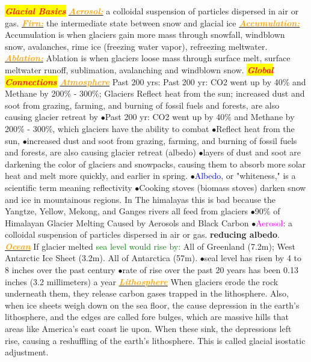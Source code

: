 \documentclass{article}
\author{SBHS Science Olympiad, Gold}
\newcommand{\ddd}{$\bullet$}
\newcommand{\red}[1]{\textcolor{red}{#1}}
\newcommand{\green}[1]{\textcolor{green}{#1}}
\newcommand{\blue}[1]{\textcolor{blue}{#1}}
\newcommand{\pink}[1]{\textcolor{magenta}{#1}}
\newcommand{\orange}[1]{\textcolor{orange}{#1}}
\newcommand{\mysection}[1]{\colorbox{yellow}{\textbf{\textit{\red{#1}}}}}
\newcommand{\mysub}[1]{\underline{\textbf{{\textit{\orange{#1}}}}}}
\newcommand{\mysubsub}[1]{{{\green{#1}}}}
\newcommand{\vocab}[1]{{\pink{#1}}}
\begin{document}
	 \tiny
	\begin{multicols*}{4}
	
		\mysection{Glacial Basics}
		\mysub{Aerosol:} a colloidal suspension of particles dispersed in air or gas.
		\mysub{Firn:} the intermediate state between snow and glacial ice
		\mysub{Accumulation:} Accumulation is when glaciers gain more mass through snowfall, windblown snow, avalanches, rime ice (freezing water vapor), refreezing meltwater.
		\mysub{Ablation:} Ablation is when glaciers loose mass through surface melt, surface meltwater runoff, sublimation, avalanching and windblown snow.
         \mysection{Global Connections}
		\mysub{Atmosphere}
		Past 200 yrs: Past 200 yr: CO2 went up by 40\% and Methane by 200\% - 300\%; Glaciers Reflect heat from the sun; increased dust and soot from grazing, farming, and burning of fossil fuels and forests, are also causing glacier retreat by
		 \ddd Past 200 yr: CO2 went up by 40\% and Methane by 200\% - 300\%, which glaciers have the ability to combat
       \ddd Reflect heat from the sun, 
        \ddd increased dust and soot from grazing, farming, and burning of fossil fuels and forests, are also causing glacier retreat (albedo)
        \ddd layers of dust and soot are darkening the color of glaciers and snowpacks, causing them to absorb more solar heat and melt more quickly, and earlier in spring.
        \ddd \blue{Albedo}, or "whiteness," is a scientific term meaning reflectivity
        \ddd Cooking stoves (biomass stoves) darken snow and ice in mountainous regions. In The himalayas this is bad because the Yangtze, Yellow, Mekong, and Ganges rivers all feed from glaciers
        \ddd 90\% of Himalayan Glacier Melting Caused by Aerosols and Black Carbon
        \ddd \vocab{Aerosol}: a colloidal suspension of particles dispersed in air or gas.
		\textbf{reducing albedo}.
		\mysub{Ocean} If glacier melted 
		\mysubsub{sea level would rise by: } All of Greenland (7.2m); West Antarctic Ice Sheet (3.2m). All of Antarctica (57m). 
         \ddd seal level has risen by 4 to 8 inches over the past century
         \ddd rate of rise over the past 20 years has been 0.13 inches (3.2 millimeters) a year
		\mysub{Lithosphere} When glaciers erode the rock underneath them, they release carbon gases trapped in the lithosphere. Also, when ice sheets weigh down on the sea floor, the cause depression in the earth's lithosphere, and the edges are called fore bulges, which are massive hills that areas like America's east coast lie upon. When these sink, the depressions left rise, causing a reshuffling of the earth's lithosphere. This is called glacial isostatic adjustment.

\end{multicols*}
\end{document}

